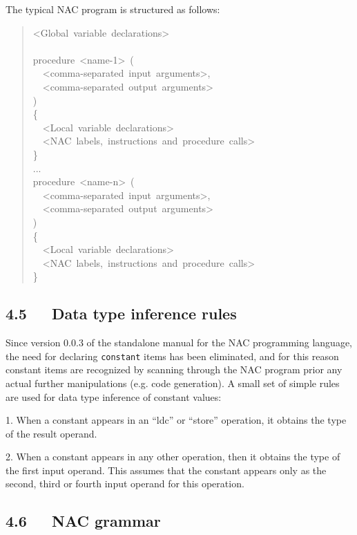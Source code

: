 \documentclass[a4paper]{article}
\begin{document}
The typical NAC program is structured as follows:
%
\begin{quote}{\ttfamily \raggedright \noindent
<Global~variable~declarations>\\
~\\
procedure~<name-1>~(\\
~~<comma-separated~input~arguments>,\\
~~<comma-separated~output~arguments>\\
)\\
\{\\
~~<Local~variable~declarations>\\
~~<NAC~labels,~instructions~and~procedure~calls>\\
\}\\
...\\
procedure~<name-n>~(\\
~~<comma-separated~input~arguments>,\\
~~<comma-separated~output~arguments>\\
)\\
\{\\
~~<Local~variable~declarations>\\
~~<NAC~labels,~instructions~and~procedure~calls>\\
\}
}
\end{quote}


\subsection{4.5~~~Data type inference rules%
  \label{data-type-inference-rules}%
}

Since version 0.0.3 of the standalone manual for the NAC programming
language, the need for declaring \texttt{constant} items has been eliminated,
and for this reason constant items are recognized by scanning through the
NAC program prior any actual further manipulations (e.g. code generation).
A small set of simple rules are used for data type inference of constant
values:

1. When a constant appears in an ``ldc'' or ``store'' operation, it obtains
the type of the result operand.

2. When a constant appears in any other operation, then it obtains the
type of the first input operand. This assumes that the constant appears
only as the second, third or fourth input operand for this operation.


\subsection{4.6~~~NAC grammar%
  \label{nac-grammar}%
}
\end{document}

